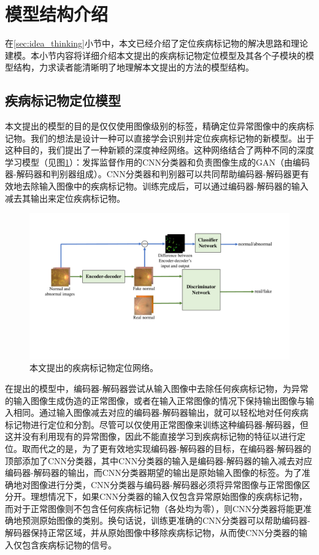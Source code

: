 \section{模型结构介绍}\label{sec:model_architecture_intro}
在\ref{sec:idea_thinking}小节中，本文已经介绍了定位疾病标记物的解决思路和理论建模。本小节内容将详细介绍本文提出的疾病标记物定位模型及其各个子模块的模型结构，力求读者能清晰明了地理解本文提出的方法的模型结构。
\subsection{疾病标记物定位模型}\label{subsec:model_architecture}
本文提出的模型的目的是仅仅使用图像级别的标签，精确定位异常图像中的疾病标记物。我们的想法是设计一种可以直接学会识别并定位疾病标记物的新模型。出于这种目的，我们提出了一种新颖的深度神经网络。这种网络结合了两种不同的深度学习模型（见图\ref{fig:our_model_architecture}）：发挥监督作用的CNN分类器和负责图像生成的GAN（由编码器-解码器和判别器组成）。CNN分类器和判别器可以共同帮助编码器-解码器更有效地去除输入图像中的疾病标记物。训练完成后，可以通过编码器-解码器的输入减去其输出来定位疾病标记物。
\begin{figure}[h]
	\centering
	\includegraphics[width=1.0\textwidth]{figure/method.pdf}
	\caption[本文提出的疾病标记物定位网络]{本文提出的疾病标记物定位网络。} 
	\label{fig:our_model_architecture}
\end{figure}
在提出的模型中，编码器-解码器尝试从输入图像中去除任何疾病标记物，为异常的输入图像生成伪造的正常图像，或者在输入正常图像的情况下保持输出图像与输入相同。通过输入图像减去对应的编码器-解码器输出，就可以轻松地对任何疾病标记物进行定位和分割。尽管可以仅使用正常图像来训练这种编码器-解码器，但这并没有利用现有的异常图像，因此不能直接学习到疾病标记物的特征以进行定位。取而代之的是，为了更有效地实现编码器-解码器的目标，在编码器-解码器的顶部添加了CNN分类器，其中CNN分类器的输入是编码器-解码器的输入减去对应编码器-解码器的输出，而CNN分类器期望的输出是原始输入图像的标签。为了准确地对图像进行分类，CNN分类器与编码器-解码器必须将异常图像与正常图像区分开。理想情况下，如果CNN分类器的输入仅包含异常原始图像的疾病标记物，而对于正常图像则不包含任何疾病标记物（各处均为零），则CNN分类器将能更准确地预测原始图像的类别。换句话说，训练更准确的CNN分类器可以帮助编码器-解码器保持正常区域，并从原始图像中移除疾病标记物，从而使CNN分类器的输入仅包含疾病标记物的信号。

